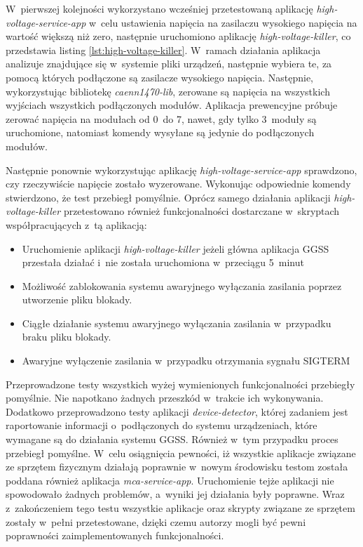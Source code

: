W~pierwszej kolejności wykorzystano wcześniej przetestowaną aplikację \emph{high-voltage-service-app} w~celu ustawienia napięcia na zasilaczu wysokiego napięcia na wartość większą niż zero, następnie uruchomiono aplikację \emph{high-voltage-killer}, co przedstawia listing \ref{lst:high-voltage-killer}. W~ramach działania aplikacja analizuje znajdujące się w~systemie pliki urządzeń, następnie wybiera te, za pomocą których podłączone są zasilacze wysokiego napięcia. Następnie, wykorzystując bibliotekę \emph{caenn1470-lib}, zerowane są napięcia na wszystkich wyjściach wszystkich podłączonych modułów. Aplikacja prewencyjne próbuje zerować napięcia na modułach od 0~do 7, nawet, gdy tylko 3~moduły są uruchomione, natomiast komendy wysyłane są jedynie do podłączonych modułów.



Następnie ponownie wykorzystując aplikację \emph{high-voltage-service-app} sprawdzono, czy rzeczywiście napięcie zostało wyzerowane. Wykonując odpowiednie komendy stwierdzono, że test przebiegł pomyślnie. Oprócz samego działania aplikacji \emph{high-voltage-killer} przetestowano również funkcjonalności dostarczane w~skryptach współpracujących z~tą aplikacją:
\begin{itemize}
    \item Uruchomienie aplikacji \emph{high-voltage-killer} jeżeli główna aplikacja GGSS przestała działać i~nie została uruchomiona w~przeciągu 5~minut
    \item Możliwość zablokowania systemu awaryjnego wyłączania zasilania poprzez utworzenie pliku blokady.
    \item Ciągłe działanie systemu awaryjnego wyłączania zasilania w~przypadku braku pliku blokady.
    \item Awaryjne wyłączenie zasilania w~przypadku otrzymania sygnału SIGTERM
\end{itemize}

Przeprowadzone testy wszystkich wyżej wymienionych funkcjonalności przebiegły pomyślnie. Nie napotkano żadnych przeszkód w~trakcie ich wykonywania. Dodatkowo przeprowadzono testy aplikacji \emph{device-detector}, której zadaniem jest raportowanie informacji o~podłączonych do systemu urządzeniach, które wymagane są do działania systemu GGSS. Również w~tym przypadku proces przebiegł pomyślne. W~celu osiągnięcia pewności, iż wszystkie aplikacje związane ze sprzętem fizycznym działają poprawnie w~nowym środowisku testom została poddana również aplikacja \emph{mca-service-app}. Uruchomienie tejże aplikacji nie spowodowało żadnych problemów, a~wyniki jej działania były poprawne. Wraz z~zakończeniem tego testu wszystkie aplikacje oraz skrypty związane ze sprzętem zostały w~pełni przetestowane, dzięki czemu autorzy mogli być pewni poprawności zaimplementowanych funkcjonalności.


